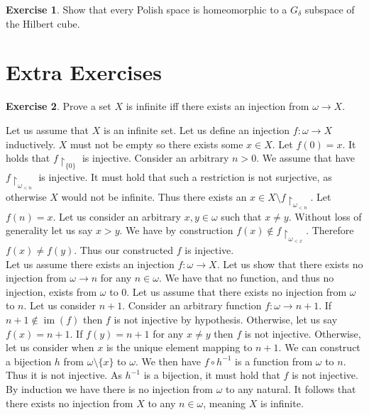 \documentclass{article}
\theoremstyle{definition}
\newtheorem{exer}{Exercise}[section]
\DeclareMathOperator{\im}{im}
\newlength{\defparindent}
\newenvironment{answer}
    {\begin{mdframed}[backgroundcolor=gray!15, linewidth=0pt] \setlength{\parindent}{\defparindent}}
    {\end{mdframed}}
\begin{document}
\begin{exer}
    Show that every Polish space is homeomorphic to a $G_\delta$ subspace of the Hilbert cube.
\end{exer}

\section{Extra Exercises}

\begin{exer}
    Prove a set $X$ is infinite iff there exists an injection from $\omega \to X$.

    \begin{answer}
        Let us assume that $X$ is an infinite set. Let us define an injection $f: \omega \to X$ inductively. $X$ must not be empty so there exists some $x \in X$. Let $f(0) = x$. It holds that $f\restriction_{\{0\}}$ is injective. Consider an arbitrary $n > 0$. We assume that have $f \restriction_{\omega_{< n}}$ is injective. It must hold that such a restriction is not surjective, as otherwise $X$ would not be infinite. Thus there exists an $x \in X \setminus f \restriction_{\omega_{< n}}$. Let $f(n) = x$. Let us consider an arbitrary $x, y \in \omega$ such that $x \ne y$. Without loss of generality let us say $x > y$. We have by construction $f(x) \not\in f\restriction_{\omega_{< x}}$. Therefore $f(x) \ne f(y)$. Thus our constructed $f$ is injective.
        \\[.1cm]
        Let us assume there exists an injection $f: \omega \to X$. Let us show that there exists no injection from $\omega \to n$ for any $n \in \omega$. We have that no function, and thus no injection, exists from $\omega$ to $0$. Let us assume that there exists no injection from $\omega$ to $n$. Let us consider $n + 1$. Consider an arbitrary function $f: \omega \to n + 1$. If $n + 1 \not\in \im(f)$ then $f$ is not injective by hypothesis. Otherwise, let us say $f(x) = n + 1$. If $f(y) = n + 1$  for any $x \ne y$ then $f$ is not injective. Otherwise, let us consider when $x$ is the unique element mapping to $n + 1$. We can construct a bijection $h$ from $\omega \setminus \{x\}$ to $\omega$. We then have $f \circ h^{-1}$ is a function from $\omega$ to $n$. Thus it is not injective. As $h^{-1}$ is a bijection, it must hold that $f$ is not injective. By induction we have there is no injection from $\omega$ to any natural. It follows that there exists no injection from $X$ to any $n \in \omega$, meaning $X$ is infinite. 
    \end{answer}
\end{exer}
\end{document}
